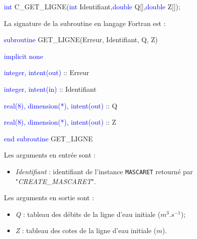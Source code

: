 \documentclass[a4paper,11pt]{article}
\begin{document}
 \vspace{0.5cm}
 
 \textcolor{blue}{int} C\_GET\_LIGNE(\textcolor{blue}{int} Identifiant,\textcolor{blue}{double} Q[],\textcolor{blue}{double} Z[]);
 
 \vspace{0.5cm} 
 
 La signature de la subroutine en langage Fortran est :
 
 \vspace{0.5cm}
 
    \textcolor{blue}{subroutine} GET\_LIGNE(Erreur, Identifiant, Q, Z)
    
        \hspace{1cm}\textcolor{blue}{implicit none}                 
        
        \hspace{1cm} \textcolor{blue}{integer, intent(out)} :: Erreur
        
        \hspace{1cm} \textcolor{blue}{integer, intent(in)}  :: Identifiant
        
        \hspace{1cm} \textcolor{blue}{real(8), dimension(*), intent(out)} :: Q
        
        \hspace{1cm} \textcolor{blue}{real(8), dimension(*), intent(out)} :: Z
        
    \textcolor{blue}{end subroutine} GET\_LIGNE

 \vspace{0.5cm}

 Les arguments en entr\'ee sont :
 
 \vspace{0.5cm}
 
 \begin{itemize} 
    \item \textit{Identifiant} : identifiant de l'instance \texttt{MASCARET} retourn\'e par "\textit{CREATE\_MASCARET}".
 \end{itemize}

\vspace{0.5cm}
 
 Les arguments en sortie sont :
 
 \vspace{0.5cm}
 
 \begin{itemize}
    \item \textit{Q} : tableau des d\'ebits de la ligne d'eau initiale ($m^3.s^{-1}$);
    \vspace{0.5cm}
    \item \textit{Z} : tableau des cotes de la ligne d'eau initiale ($m$).
 \end{itemize}
\end{document}
